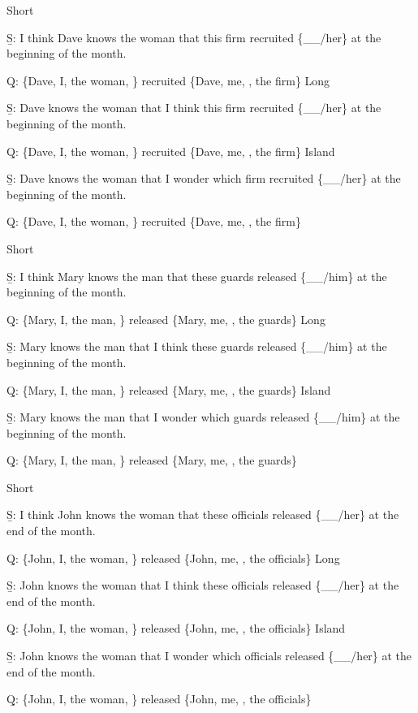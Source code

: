 \pex 
\a Short\par\nobreak
\beginsubsub 
\b{S:} I think Dave knows the woman that this firm recruited \{\_\_/her\} at the beginning of the month.\par\nobreak
\b{Q:} \{Dave, I, the woman, \} recruited \{Dave, me, , the firm\}
\endsubsub
\a Long\par\nobreak
\beginsubsub
\b{S:} Dave knows the woman that I think this firm recruited \{\_\_/her\} at the beginning of the month.\par\nobreak
\b{Q:} \{Dave, I, the woman, \} recruited \{Dave, me, , the firm\}
\endsubsub
\a Island\par\nobreak
\beginsubsub
\b{S:} Dave knows the woman that I wonder which firm recruited \{\_\_/her\} at the beginning of the month.\par\nobreak
\b{Q:} \{Dave, I, the woman, \} recruited \{Dave, me, , the firm\}
\endsubsub
\xe

\pex 
\a Short\par\nobreak
\beginsubsub 
\b{S:} I think Mary knows the man that these guards released \{\_\_/him\} at the beginning of the month.\par\nobreak
\b{Q:} \{Mary, I, the man, \} released \{Mary, me, , the guards\}
\endsubsub
\a Long\par\nobreak
\beginsubsub
\b{S:} Mary knows the man that I think these guards released \{\_\_/him\} at the beginning of the month.\par\nobreak
\b{Q:} \{Mary, I, the man, \} released \{Mary, me, , the guards\}
\endsubsub
\a Island\par\nobreak
\beginsubsub
\b{S:} Mary knows the man that I wonder which guards released \{\_\_/him\} at the beginning of the month.\par\nobreak
\b{Q:} \{Mary, I, the man, \} released \{Mary, me, , the guards\}
\endsubsub
\xe

\pex 
\a Short\par\nobreak
\beginsubsub 
\b{S:} I think John knows the woman that these officials released \{\_\_/her\} at the end of the month.\par\nobreak
\b{Q:} \{John, I, the woman, \} released \{John, me, , the officials\}
\endsubsub
\a Long\par\nobreak
\beginsubsub
\b{S:} John knows the woman that I think these officials released \{\_\_/her\} at the end of the month.\par\nobreak
\b{Q:} \{John, I, the woman, \} released \{John, me, , the officials\}
\endsubsub
\a Island\par\nobreak
\beginsubsub
\b{S:} John knows the woman that I wonder which officials released \{\_\_/her\} at the end of the month.\par\nobreak
\b{Q:} \{John, I, the woman, \} released \{John, me, , the officials\}
\endsubsub
\xe

